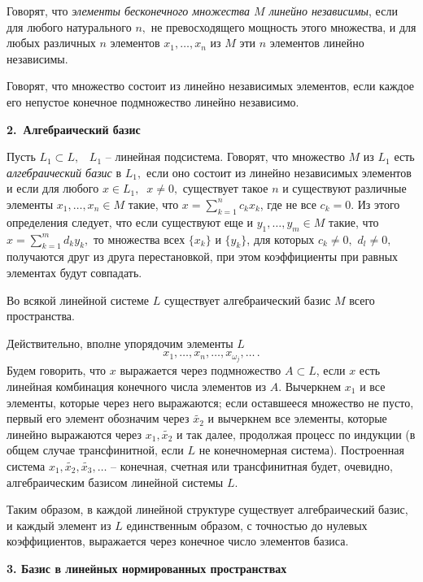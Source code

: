  Говорят, что {\it элементы бесконечного множества $M$ линейно независимы},
 если для любого натурального $n,$ не превосходящего мощность этого множества,
 и для любых различных $n$ элементов
 $x_1,\ldots,x_n$ из $M$ эти $n$ элементов линейно независимы.

 Говорят, что множество состоит  из линейно независимых элементов,
 если каждое его непустое конечное подмножество линейно независимо.

 {\bf 2.~Алгебраический базис}
\vspace{5mm}

 Пусть $L_1 \subset L,$~ $L_1$ -- линейная подсистема. Говорят, что
 множество $M$ из $L_1$ есть {\it алгебраический базис} в $L_1,$ {если оно состоит из линейно независимых элементов и}
 если для любого $x\in L_1,$ $\ x\ne 0,$ существует такое $n$
 и существуют {различные элементы} $x_1,\ldots,x_n\in M$ такие, что
 $x=\sum\limits_{k=1}^n c_k x_k$, где
 не все $c_k=0$. {Из этого определения} {следует, что} если существуют еще и
 $y_1,\ldots,y_{{m}}\in M$ такие,
 что $x=\sum\limits_{k=1}^{{m}} d_k y_k,$ то {множества всех
 $\{x_k\}$ и $\{y_k\}$,} для которых
 $c_k\ne 0,$ {$d_l\ne 0,$} получаются друг из друга перестановкой,
 {при этом коэффициенты при равных элементах будут совпадать.}

 Во всякой линейной системе $L$ существует алгебраический базис $M$
 всего пространства.

 Действительно, вполне упорядочим элементы $L$
 $$
 x_1,\ldots,x_n,\ldots,x_{\omega_j},\ldots\,.
 $$
 {Будем говорить, что $x$ выражается через подмножество $A\subset L$, если $x$ есть линейная}
 {комбинация конечного числа элементов из $A$.}
 Вычеркнем $x_1$ и все элементы, которые через него выражаются;
 если оставшееся множество не пусто, первый его элемент
 обозначим через $\widetilde{x_2}$ и вычеркнем все
 элементы, которые линейно выражаются через $x_1, \widetilde{x_2}$
 и так далее, продолжая процесс по индукции (в общем случае трансфинитной, если $L$ не
 конечномерная система).
 Построенная система
 $x_1,\widetilde{x_2},\widetilde{x_3},\ldots$ -- конечная,
 счетная или трансфинитная будет, очевидно, алгебраическим
 базисом линейной системы $L.$

 Таким образом, в каждой линейной структуре
 существует алгебраический базис, и каждый элемент из $L$
 единственным образом, с точностью до нулевых
 коэффициентов, выражается через конечное число элементов базиса.

\vspace{5mm}
{\bf 3. Базис в линейных нормированных пространствах}
\vspace{5mm}

